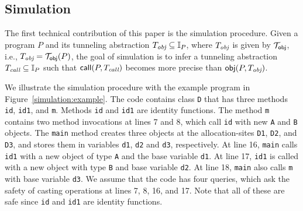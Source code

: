 

\subsection{Simulation}\label{sec:simulation}


The first technical contribution of this paper is the simulation procedure. 
Given a program $P$ and its tunneling abstraction $T_{\text{\it obj}} \subseteq \mathbb{I}_P$, where $T_{\text{\it obj}}$ is given by $\mathcal{T}_{{\sf obj}}$, i.e., 
$T_{\text{\it obj}} = \mathcal{T}_{{\sf obj}}(P)$,
the goal of simulation is to infer a tunneling abstraction
$T_{\text{\it call}} \subseteq \mathbb{I}_P$ such that ${\sf call}(P, T_{\text{\it call}})$ becomes more
precise than ${\sf obj} (P, T_{\text{\it obj}})$.




\label{sec:simulation-overview}
We illustrate the simulation procedure with the
example program in Figure~\ref{simulation:example}.  The code
contains class {\tt D} that has three methods \texttt{id},
\texttt{id1}, and \texttt{m}.  Methods \texttt{id} and \texttt{id1}
are identity functions.
The method \texttt{m} contains two method invocations at lines 7 and
8, which call \texttt{id} with new \texttt{A} and \texttt{B} objects.
The \texttt{main} method creates three objects at the
allocation-sites \texttt{D1}, \texttt{D2}, and \texttt{D3}, and stores
them in variables \texttt{d1}, \texttt{d2} and \texttt{d3},
respectively.  At line 16, \texttt{main} calls \texttt{id1} with
a new object of type {\tt A} and the base variable \texttt{d1}.  At line 17,
\texttt{id1} is called with a new object with type {\tt B} and base variable
\texttt{d2}.  At line 18, \texttt{main} also calls {\tt m} with base
variable \texttt{d3}.  We assume that the code has four queries, which ask the
safety of casting operations at lines 7, 8, 16, and 17. Note that all
of these are safe since {\tt id} and {\tt id1} are identity
functions.








